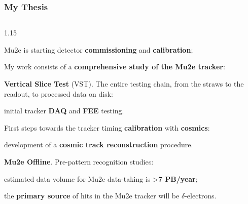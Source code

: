 \documentclass{beamer}
\begin{document}
\begin{frame}
    \frametitle{My Thesis}
    
\begin{columns}
   \begin{column}{1.15\framewidth} 
         \setlength{\leftmargini}{1.3em}
\vspace{-4mm}
\begin{itemize}
    {\footnotesize \item Mu2e is starting detector \textbf{commissioning} and \textbf{calibration};}
     \vspace{5mm}
     {\footnotesize \item My work consists of a \textbf{comprehensive study of the Mu2e tracker}:}
\vspace{4mm}
  \begin{itemize}
    {\footnotesize \item \textbf{Vertical Slice Test} (VST). The entire 
testing chain, from the straws to the readout, to processed data on disk:}
     \vspace{3mm}
 \begin{itemize}
    {\footnotesize \item initial tracker \textbf{DAQ} and \textbf{FEE} testing.}
     \end{itemize}
     \vspace{4mm}

     {\footnotesize \item First steps towards the tracker timing \textbf{calibration} with \textbf{cosmics}:}
         \vspace{3mm}
    \begin{itemize}
        {\footnotesize  \item development of a \textbf{cosmic track reconstruction} procedure.}
    \end{itemize}
         \vspace{4mm}

         {\footnotesize \item \textbf{Mu2e Offline}. Pre-pattern recognition studies:}
         \vspace{3mm}
    \begin{itemize}
        {\footnotesize  \item estimated data volume for Mu2e data-taking 
is >\textbf{7 PB/year};
     \vspace{2.5mm}
\item the \textbf{primary source} of hits in the 
Mu2e tracker will be $\delta$-electrons.}
    \end{itemize}
        \end{itemize}
\end{itemize}
 \end{column}
 \end{columns}
     

\end{frame}
\end{document}
